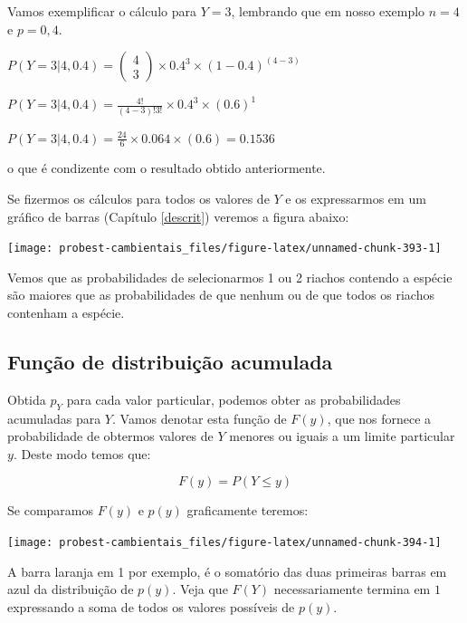 \documentclass[
]{book}
\begin{document}
Vamos exemplificar o cálculo para \(Y = 3\), lembrando que em nosso exemplo \(n = 4\) e \(p = 0,4\).

\(P(Y = 3|4,0.4) = \left (\begin{array}{c} 4 \\ 3 \end{array}\right) \times 0.4^3 \times (1-0.4)^{(4-3)}\)

\(P(Y = 3|4,0.4) = \frac{4!}{(4-3)!3!} \times 0.4^3 \times (0.6)^{1}\)

\(P(Y = 3|4,0.4) = \frac{24}{6} \times 0.064 \times (0.6) = 0.1536\)

o que é condizente com o resultado obtido anteriormente.

Se fizermos os cálculos para todos os valores de \(Y\) e os expressarmos em um gráfico de barras (Capítulo \ref{descrit}) veremos a figura abaixo:

\begin{center}\texttt{[image: probest-cambientais\_files/figure-latex/unnamed-chunk-393-1]} \end{center}

Vemos que as probabilidades de selecionarmos 1 ou 2 riachos contendo a espécie são maiores que as probabilidades de que nenhum ou de que todos os riachos contenham a espécie.

\hypertarget{funuxe7uxe3o-de-distribuiuxe7uxe3o-acumulada}{%
\subsection*{Função de distribuição acumulada}\label{funuxe7uxe3o-de-distribuiuxe7uxe3o-acumulada}}

Obtida \(p_Y\) para cada valor particular, podemos obter as probabilidades acumuladas para \(Y\). Vamos denotar esta função de \(F(y)\), que nos fornece a probabilidade de obtermos valores de \(Y\) menores ou iguais a um limite particular \(y\). Deste modo temos que:

\[F(y) = P(Y \le y)\]

Se comparamos \(F(y)\) e \(p(y)\) graficamente teremos:

\begin{center}\texttt{[image: probest-cambientais\_files/figure-latex/unnamed-chunk-394-1]} \end{center}

A barra laranja em 1 por exemplo, é o somatório das duas primeiras barras em azul da distribuição de \(p(y)\). Veja que \(F(Y)\) necessariamente termina em \(1\) expressando a soma de todos os valores possíveis de \(p(y)\).
\end{document}
